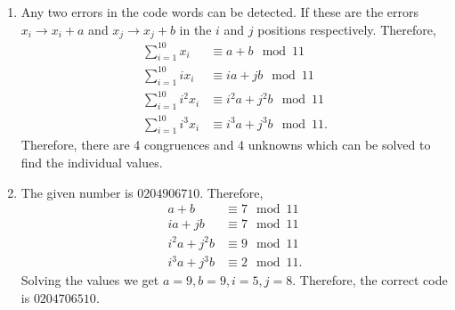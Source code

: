 \documentclass{article}
\theoremstyle{definition}
\begin{document}
\begin{enumerate}
\begin{enumerate}
        \item
        
        Any two errors in the code words can be detected. If these are the errors $x_i \rightarrow x_i + a$ and $x_j \rightarrow x_j + b$ in the $i$ and $j$ positions respectively. Therefore, 
        \begin{align*}
            \sum_{i = 1}^{10}x_i &\equiv a + b\mod 11\\
             \sum_{i = 1}^{10}ix_i &\equiv ia + jb\mod 11\\
             \sum_{i = 1}^{10}i^2x_i &\equiv i^2a + j^2b\mod 11\\
             \sum_{i = 1}^{10}i^3x_i &\equiv i^3a + j^3b\mod 11.
        \end{align*} Therefore, there are 4 congruences and 4 unknowns which can be solved to find the individual values.
        
        \item
        
        The given number is $0204906710$. Therefore,
        \begin{align*}
            a + b &\equiv 7\mod 11\\
            ia + jb &\equiv 7 \mod 11\\
            i^2a + j^2b &\equiv 9\mod 11\\
            i^3a + j^3b &\equiv 2\mod 11.
        \end{align*} Solving the values we get $a = 9, b = 9, i = 5, j = 8$. Therefore, the correct code is $0204706510.$
        
    \end{enumerate}
    
\end{enumerate}
\end{document}
